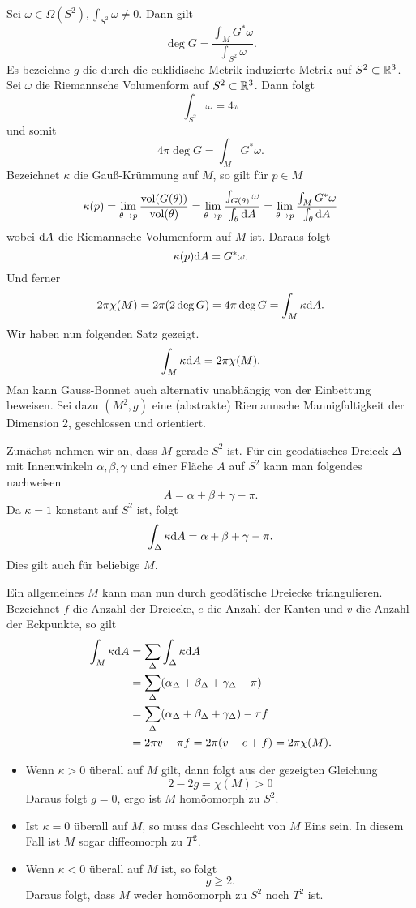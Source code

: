
Sei $\omega \in \Omega(S^2), \int_{S^2}\omega \neq 0$. Dann gilt
\[ \deg G = \frac{\int_M G^* \omega}{\int_{S^2} \omega }.  \]
Es bezeichne $g$ die durch die euklidische Metrik induzierte Metrik auf $S^2 \subset \mathbb{R}^3$. Sei $\omega$ die Riemannsche Volumenform auf $S^2 \subset \mathbb{R}^3$. Dann folgt
\[ \int_{S^2}\omega = 4\pi \]
und somit
\[ 4\pi \deg G = \int_M G^* \omega. \]
Bezeichnet $\kappa$ die Gauß-Krümmung auf $M$, so gilt für $p \in M$
\[ \kappa(p) = \lim\limits_{\theta \overset{}{\rightarrow} p} \frac{\mathrm{vol} (G(\theta))}{\mathrm{vol}(\theta )}
= \lim\limits_{\theta \overset{}{\rightarrow} p} \frac{\int_{G(\theta)}\omega}{\int_\theta\text{d} A} = \lim\limits_{\theta \overset{}{\rightarrow} p} \frac{\int_{M}G^*\omega}{\int_\theta\text{d} A}  \]
wobei $\text{d} A$ die Riemannsche Volumenform auf $M$ ist. Daraus folgt
\[ \kappa(p) \text{d} A = G^* \omega. \]
Und ferner
\[ 2\pi \chi(M) = 2\pi (2 \deg G ) = 4\pi \deg G = \int_M \kappa \text{d} A. \]
Wir haben nun folgenden Satz gezeigt.
\[ \int_M \kappa \text{d} A = 2\pi \chi(M). \]
\Bem{}
Man kann Gauss-Bonnet auch alternativ unabhängig von der Einbettung beweisen. Sei dazu $(M^2, g)$ eine (abstrakte) Riemannsche Mannigfaltigkeit der Dimension 2, geschlossen und orientiert.

Zunächst nehmen wir an, dass $M$ gerade $S^2$ ist. Für ein geodätisches Dreieck $\Delta$ mit Innenwinkeln $\alpha, \beta, \gamma$ und einer Fläche $A$ auf $S^2$ kann man folgendes nachweisen
\[ A= \alpha + \beta + \gamma - \pi. \]
Da $\kappa = 1$ konstant auf $S^2$ ist, folgt
\[ \int_{\Delta}\kappa \text{d} A = \alpha + \beta + \gamma - \pi.  \]
Dies gilt auch für beliebige $M$.


Ein allgemeines $M$ kann man nun durch geodätische Dreiecke triangulieren. Bezeichnet $f$ die Anzahl der Dreiecke, $e$ die Anzahl der Kanten und $v$ die Anzahl der Eckpunkte, so gilt
\begin{align*}
\int_M \kappa \text{d} A &= \sum_{\Delta} \int_{\Delta}\kappa \text{d} A\\
&= \sum_{\Delta} (\alpha_\Delta + \beta_\Delta + \gamma_\Delta - \pi)\\
&= \sum_{\Delta} (\alpha_\Delta + \beta_\Delta + \gamma_\Delta) - \pi f\\
&= 2\pi v- \pi f = 2\pi (v-e+f) = 2\pi \chi(M).
\end{align*}

\begin{itemize}
	\item Wenn $\kappa>0$ überall auf $M$ gilt, dann folgt aus der gezeigten Gleichung
	\[ 2-2g = \chi(M) > 0  \]
	Daraus folgt $g = 0$, ergo ist $M$ homöomorph zu $S^2$.
	\item Ist $\kappa = 0$ überall auf $M$, so muss das Geschlecht von $M$ Eins sein. In diesem Fall ist $M$ sogar diffeomorph zu $T^2$.
	\item Wenn $\kappa < 0$ überall auf $M$ ist, so folgt
	\[ g \geq 2. \]
	Daraus folgt, dass $M$ weder homöomorph zu $S^2$ noch $T^2$ ist.
\end{itemize}

